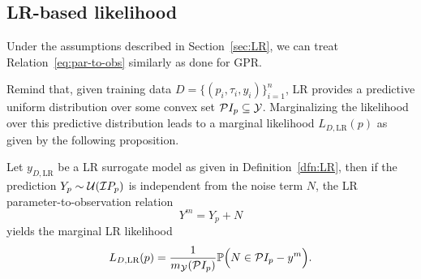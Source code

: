 \subsection{LR-based likelihood}\label{sec:LRlike}

Under the assumptions described in Section~\ref{sec:LR}, we can treat Relation~\eqref{eq:par-to-obs} similarly as done for GPR. 

Remind that, given training data $D =\{ (p_i, \tau_i, y_i) \}_{i=1}^n$, LR provides a predictive uniform distribution over some convex set $\mathcal PI_p \subseteq \mathcal Y $.
Marginalizing the likelihood over this predictive distribution leads to a marginal likelihood $L_{D, \text{LR}}(p)$ as given by the following proposition.

\begin{prp}\label{prp:LR-likelihood}
    Let $y_{D, \text{LR}}$ be a LR surrogate model as given in Definition~\ref{dfn:LR}, then if the prediction $Y_p \sim \mathcal U (\mathcal IP_p)$ is independent from the noise term $N$, the LR parameter-to-observation relation 
    \begin{equation*}
        Y^m = Y_p + N 
    \end{equation*}
    yields the marginal LR likelihood
    \begin{equation}\label{eq:LR-likelihood}
        L_{D, \text{LR}}(p) = \frac{1}{m_\mathcal Y (\mathcal PI_p)} \mathbb P \Big ( N \in \mathcal PI_p - y^m \Big ).
    \end{equation}
\end{prp}
